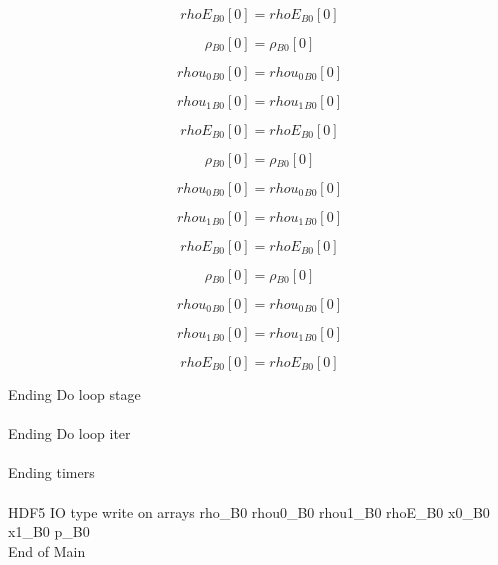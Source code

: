 \documentclass{article}
\begin{document}
\begin{dmath}{rhoE{_{B0}}}[{0}] = {rhoE{_{B0}}}[{0}]\end{dmath}

\begin{dmath}{\rho{_{B0}}}[{0}] = {\rho{_{B0}}}[{0}]\end{dmath}

\begin{dmath}{rhou_{0}{_{B0}}}[{0}] = {rhou_{0}{_{B0}}}[{0}]\end{dmath}

\begin{dmath}{rhou_{1}{_{B0}}}[{0}] = {rhou_{1}{_{B0}}}[{0}]\end{dmath}

\begin{dmath}{rhoE{_{B0}}}[{0}] = {rhoE{_{B0}}}[{0}]\end{dmath}

\begin{dmath}{\rho{_{B0}}}[{0}] = {\rho{_{B0}}}[{0}]\end{dmath}

\begin{dmath}{rhou_{0}{_{B0}}}[{0}] = {rhou_{0}{_{B0}}}[{0}]\end{dmath}

\begin{dmath}{rhou_{1}{_{B0}}}[{0}] = {rhou_{1}{_{B0}}}[{0}]\end{dmath}

\begin{dmath}{rhoE{_{B0}}}[{0}] = {rhoE{_{B0}}}[{0}]\end{dmath}

\begin{dmath}{\rho{_{B0}}}[{0}] = {\rho{_{B0}}}[{0}]\end{dmath}

\begin{dmath}{rhou_{0}{_{B0}}}[{0}] = {rhou_{0}{_{B0}}}[{0}]\end{dmath}

\begin{dmath}{rhou_{1}{_{B0}}}[{0}] = {rhou_{1}{_{B0}}}[{0}]\end{dmath}

\begin{dmath}{rhoE{_{B0}}}[{0}] = {rhoE{_{B0}}}[{0}]\end{dmath}

\noindent Ending Do loop stage\\
\\\noindent Ending Do loop iter\\
\\\noindent Ending timers\\
\\\noindent HDF5 IO type write on arrays rho_B0 rhou0_B0 rhou1_B0 rhoE_B0 x0_B0 x1_B0 p_B0\\\noindent End of Main\\
\end{document}
